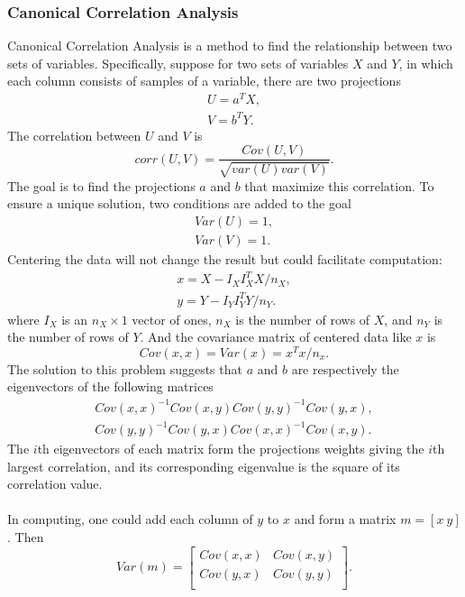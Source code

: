 \documentclass[12pt]{article}
\begin{document}
\subsubsection{Canonical Correlation Analysis}
Canonical Correlation Analysis is a method to find the relationship between two sets of variables. Specifically, suppose for two sets of variables $X$ and $Y$, in which each column consists of samples of a variable, there are two projections\begin{gather}
U=a^TX,\\
V=b^TY.
\end{gather}
The correlation between $U$ and $V$ is\begin{equation}
corr(U,V)=\frac{Cov(U,V)}{\sqrt{var(U)var(V)}}.
\end{equation}
The goal is to find the projections $a$ and $b$ that maximize this correlation. To ensure a unique solution, two conditions are added to the goal\begin{gather}
Var(U)=1,\\
Var(V)=1.
\end{gather}
Centering the data will not change the result but could facilitate computation:\begin{gather}
x=X-I_XI_X^TX/n_X,\\
y=Y-I_YI_Y^TY/n_Y.
\end{gather}
where $I_X$ is an $n_X \times 1$ vector of ones, $n_X$ is the number of rows of $X$, and $n_Y$ is the number of rows of $Y$. And the covariance matrix of centered data like $x$ is \begin{equation}
Cov(x,x) = Var(x)=x^Tx/n_x.
\end{equation}
The solution to this problem suggests that $a$ and $b$ are respectively the eigenvectors of the following matrices\begin{gather}
Cov(x,x) ^{-1} Cov(x,y) Cov(y, y) ^{-1} Cov(y, x),\\
Cov(y,y) ^{-1} Cov(y,x) Cov(x, x) ^{-1} Cov(x, y).
\end{gather}
The $i$th eigenvectors of each matrix form the projections weights giving the $i$th largest correlation, and its corresponding eigenvalue is the square of its correlation value.\\
\\
In computing, one could add each column of $y$ to $x$ and form a matrix $m = [x~ y]$. Then \begin{equation}
Var(m) = \left[\begin{array}{ccc}
    Cov(x,x) & Cov(x,y) \\
    Cov(y,x) & Cov(y,y)\\ 
  \end{array}
  \right].
\end{equation}
\end{document}
